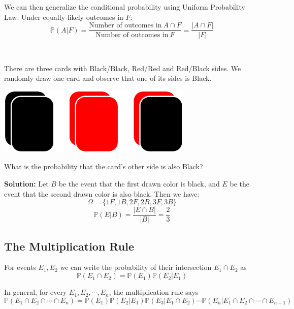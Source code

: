 We can then generalize the conditional probability using Uniform Probability Law. Under equally-likely outcomes in \(F\): 
\[
    \mathbb{P}(A|F) = \dfrac{\text{Number of outcomes in}\ A \cap F}{\text{Number of outcomes in}\ F} = \dfrac{\vert A \cap F \vert}{\vert F \vert}
\]

\begin{eg}~ 

    \begin{minipage}{0.7\textwidth}
        There are three cards with Black/Black, Red/Red and Red/Black sides. We randomly draw one card and observe that one of its sides is Black.
    \end{minipage}
    \begin{minipage}{0.3\textwidth}
        \centering
        \includegraphics[width=0.7\textwidth]{Figures/EgCard.pdf}
    \end{minipage}

    What is the probability that the card's other side is also Black?

    \textbf{Solution:}
    Let \(B\) be the event that the first drawn color is black, and \(E\) be the event that the second drawn color is also black. Then we have:
    \[
        \Omega = \{1F, 1B, 2F, 2B, 3F, 3B\}
    \]
    \[
        \mathbb{P}(E|B) = \dfrac{\vert E \cap B \vert}{\vert B \vert} = \dfrac{2}{3}
    \]
\end{eg}

\subsection{The Multiplication Rule}
\begin{proposition}
    For events \(E_1, E_2\) we can write the probability of their intersection \(E_1 \cap E_2\) as 
    \[
        \mathbb{P}(E_1 \cap E_2) = \mathbb{P}(E_1)\mathbb{P}(E_2 \vert E_1)
    \] 
\end{proposition}

In general, for every \(E_1, E_2, \cdots, E_n\), the multiplication rule says 
\[
    \mathbb{P}(E_1 \cap E_2 \cap \cdots \cap E_n) = \mathbb{P}(E_1)\mathbb{P}(E_2 \vert E_1)\mathbb{P}(E_3 \vert E_1 \cap E_2)\cdots\mathbb{P}(E_n \vert E_1 \cap E_2 \cap \cdots \cap E_{n-1} )
\]

